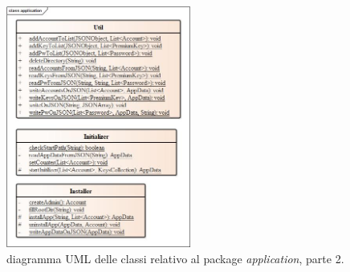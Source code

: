\documentclass[a4paper, 12pt, one column, aas_macros]{article}
\begin{document}
	\begin{figure}[h!]
		\centering
		\includegraphics[height=300px]{UML/application2.jpg}
		\caption{diagramma UML delle classi relativo al package \textit{application}, parte \num{2}.}
		\label{UML_application_2}
	\end{figure}
	
\end{document}
